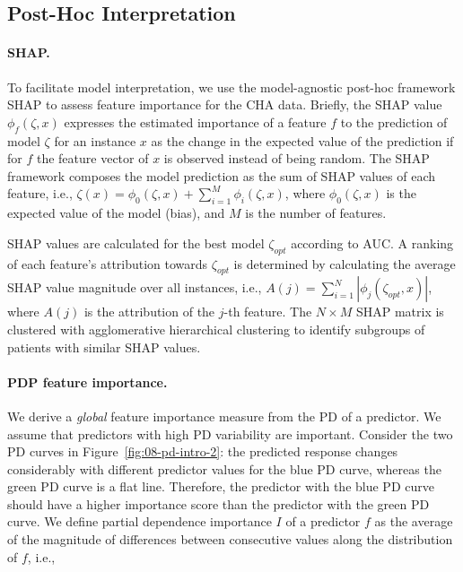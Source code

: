 \documentclass[
  oneside]{book}
\begin{document}
\hypertarget{iml-workflow-iml}{%
\subsection{Post-Hoc Interpretation}\label{iml-workflow-iml}}

\paragraph*{SHAP.}

To facilitate model interpretation, we use the model-agnostic post-hoc framework SHAP \autocite{Lundberg:SHAP2017,Lundberg:TreeSHAP2019} to assess feature importance for the CHA data.
Briefly, the SHAP value \(\phi_f(\zeta,x)\) expresses the estimated importance of a feature \(f\) to the prediction of model \(\zeta\) for an instance \(x\) as the change in the expected value of the prediction if for \(f\) the feature vector of \(x\) is observed instead of being random.
The SHAP framework composes the model prediction as the sum of SHAP values of each feature, i.e., \(\zeta(x)=\phi_0(\zeta,x)+\sum_{i=1}^M \phi_i(\zeta,x)\), where \(\phi_0(\zeta,x)\) is the expected value of the model (bias), and \(M\) is the number of features.

SHAP values are calculated for the best model \(\zeta_{opt}\) according to AUC.
A ranking of each feature's attribution towards \(\zeta_{opt}\) is determined by calculating the average SHAP value magnitude over all instances, i.e., \(A(j)=\sum_{i=1}^N |\phi_j(\zeta_{opt},x)|\),
where \(A(j)\) is the attribution of the \(j\)-th feature.
The \(N\times M\) SHAP matrix is clustered with agglomerative hierarchical clustering to identify subgroups of patients with similar SHAP values.

\paragraph*{PDP feature importance.}

We derive a \emph{global} feature importance measure from the PD of a predictor.
We assume that predictors with high PD variability are important.
Consider the two PD curves in Figure~\ref{fig:08-pd-intro-2}: the predicted response changes considerably with different predictor values for the blue PD curve, whereas the green PD curve is a flat line.
Therefore, the predictor with the blue PD curve should have a higher importance score than the predictor with the green PD curve.
We define partial dependence importance \(I\) of a predictor \(f\) as the average of the magnitude of differences between consecutive values along the distribution of \(f\), i.e.,
\end{document}
